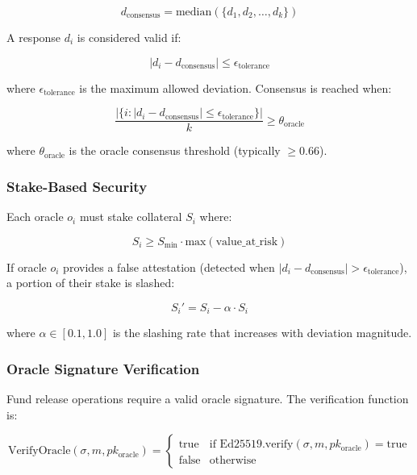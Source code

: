 \documentclass[11pt,a4paper]{article}
\begin{document}
\begin{equation}
d_{\text{consensus}} = \text{median}(\{d_1, d_2, \ldots, d_k\})
\end{equation}

A response $d_i$ is considered valid if:

\begin{equation}
|d_i - d_{\text{consensus}}| \leq \epsilon_{\text{tolerance}}
\end{equation}

where $\epsilon_{\text{tolerance}}$ is the maximum allowed deviation. Consensus is reached when:

\begin{equation}
\frac{|\{i : |d_i - d_{\text{consensus}}| \leq \epsilon_{\text{tolerance}}\}|}{k} \geq \theta_{\text{oracle}}
\end{equation}

where $\theta_{\text{oracle}}$ is the oracle consensus threshold (typically $\geq 0.66$).

\subsubsection{Stake-Based Security}

Each oracle $o_i$ must stake collateral $S_i$ where:

\begin{equation}
S_i \geq S_{\text{min}} \cdot \text{max}(\text{value\_at\_risk})
\end{equation}

If oracle $o_i$ provides a false attestation (detected when $|d_i - d_{\text{consensus}}| > \epsilon_{\text{tolerance}}$), a portion of their stake is slashed:

\begin{equation}
S_i' = S_i - \alpha \cdot S_i
\end{equation}

where $\alpha \in [0.1, 1.0]$ is the slashing rate that increases with deviation magnitude.

\subsubsection{Oracle Signature Verification}

Fund release operations require a valid oracle signature. The verification function is:

\begin{equation}
\text{VerifyOracle}(\sigma, m, pk_{\text{oracle}}) = \begin{cases}
\text{true} & \text{if Ed25519.verify}(\sigma, m, pk_{\text{oracle}}) = \text{true} \\
\text{false} & \text{otherwise}
\end{cases}
\end{equation}
\end{document}
